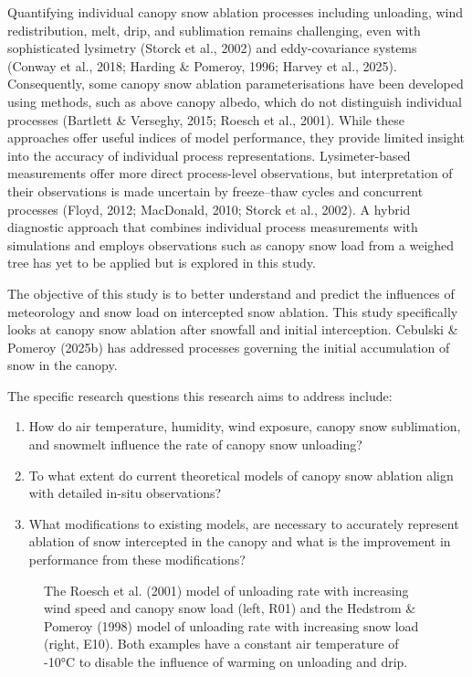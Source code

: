 \documentclass[
]{agujournal2019}
\makeatletter
\newcommand*\pandocbounded[1]{%
  \sbox\pandoc@box{#1}%
  \Gscale@div\@tempa{\textheight}{\dimexpr\ht\pandoc@box+\dp\pandoc@box\relax}%
  \Gscale@div\@tempb{\linewidth}{\wd\pandoc@box}%
  \ifdim\@tempb\p@<\@tempa\p@\let\@tempa\@tempb\fi%
  \ifdim\@tempa\p@<\p@\scalebox{\@tempa}{\usebox\pandoc@box}%
  \else\usebox{\pandoc@box}%
  \fi%
}
\makeatother
\begin{document}
Quantifying individual canopy snow ablation processes including
unloading, wind redistribution, melt, drip, and sublimation remains
challenging, even with sophisticated lysimetry (Storck et al., 2002) and
eddy-covariance systems (Conway et al., 2018; Harding \& Pomeroy, 1996;
Harvey et al., 2025). Consequently, some canopy snow ablation
parameterisations have been developed using methods, such as above
canopy albedo, which do not distinguish individual processes (Bartlett
\& Verseghy, 2015; Roesch et al., 2001). While these approaches offer
useful indices of model performance, they provide limited insight into
the accuracy of individual process representations. Lysimeter-based
measurements offer more direct process-level observations, but
interpretation of their observations is made uncertain by freeze--thaw
cycles and concurrent processes (Floyd, 2012; MacDonald, 2010; Storck et
al., 2002). A hybrid diagnostic approach that combines individual
process measurements with simulations and employs observations such as
canopy snow load from a weighed tree has yet to be applied but is
explored in this study.

The objective of this study is to better understand and predict the
influences of meteorology and snow load on intercepted snow ablation.
This study specifically looks at canopy snow ablation after snowfall and
initial interception. Cebulski \& Pomeroy (2025b) has addressed
processes governing the initial accumulation of snow in the canopy.

The specific research questions this research aims to address include:

\begin{enumerate}
\def\labelenumi{\arabic{enumi}.}
\item
  How do air temperature, humidity, wind exposure, canopy snow
  sublimation, and snowmelt influence the rate of canopy snow unloading?
\item
  To what extent do current theoretical models of canopy snow ablation
  align with detailed in-situ observations?
\item
  What modifications to existing models, are necessary to accurately
  represent ablation of snow intercepted in the canopy and what is the
  improvement in performance from these modifications?
\end{enumerate}

\begin{figure}[htbp]

\centering{

\pandocbounded{\texttt{[image: figs/final/figure1.png]}}

}

\caption{\label{fig-unl-ex-wind}The Roesch et al. (2001) model of
unloading rate with increasing wind speed and canopy snow load (left,
R01) and the Hedstrom \& Pomeroy (1998) model of unloading rate with
increasing snow load (right, E10). Both examples have a constant air
temperature of -10°C to disable the influence of warming on unloading
and drip.}

\end{figure}%
\end{document}

